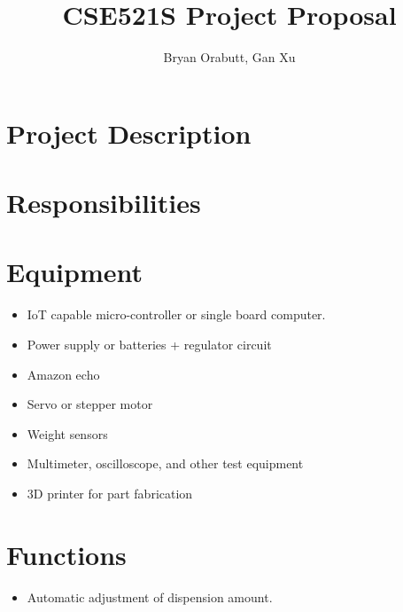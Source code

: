 \documentclass[notitlepage]{article}
\title{CSE521S Project Proposal}
\author{Bryan Orabutt, Gan Xu}
\begin{document}
\maketitle 
\section*{Project Description}

\section*{Responsibilities}

\section*{Equipment}
    \begin{itemize}
        \item IoT capable micro-controller or single board computer.
        \item Power supply or batteries + regulator circuit
        \item Amazon echo
        \item Servo or stepper motor
        \item Weight sensors
        \item Multimeter, oscilloscope, and other test equipment
        \item 3D printer for part fabrication
    \end{itemize}

\section*{Functions}
    \begin{itemize}
        \item Automatic adjustment of dispension amount.
    \end{itemize}
\end{document}
